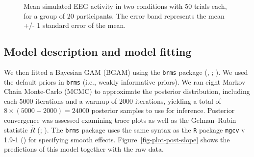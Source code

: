 \documentclass[
  man,
  floatsintext,
  longtable,
  a4paper,
  nolmodern,
  notxfonts,
  notimes,
  colorlinks=true,linkcolor=blue,citecolor=blue,urlcolor=blue]{apa7}
\begin{document}
\begin{figure}[!htb]

\caption{\label{fig-eeg}Mean simulated EEG activity in two conditions
with 50 trials each, for a group of 20 participants. The error band
represents the mean +/- 1 standard error of the mean.}


\end{figure}%

\subsection{Model description and model
fitting}\label{model-description-and-model-fitting}

We then fitted a Bayesian GAM (BGAM) using the \texttt{brms} package
(, ;
). We used the
default priors in \texttt{brms} (i.e., weakly informative priors). We
ran eight Markov Chain Monte-Carlo (MCMC) to approximate the posterior
distribution, including each 5000 iterations and a warmup of 2000
iterations, yielding a total of \(8 \times (5000-2000) = 24000\)
posterior samples to use for inference. Posterior convergence was
assessed examining trace plots as well as the Gelman--Rubin statistic
\(\hat{R}\) (;
). The \texttt{brms}
package uses the same syntax as the \texttt{R} package \texttt{mgcv} v
1.9-1 () for specifying smooth effects.
Figure~\ref{fig-plot-post-slope} shows the predictions of this model
together with the raw data.
\end{document}
